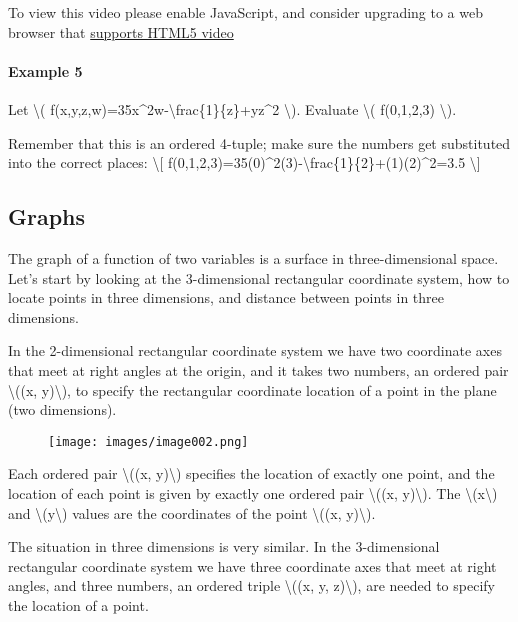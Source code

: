 To view this video please enable JavaScript, and consider upgrading to a
web browser that \href{http://videojs.com/html5-video-support/}{supports
HTML5 video}

\hypertarget{example-5}{%
\paragraph{Example 5}\label{example-5}}

Let \textbackslash{}(
f(x,y,z,w)=35x\^{}2w-\textbackslash{}frac\{1\}\{z\}+yz\^{}2
\textbackslash{}). Evaluate \textbackslash{}( f(0,1,2,3)
\textbackslash{}).

Remember that this is an ordered 4-tuple; make sure the numbers get
substituted into the correct places: \textbackslash{}{[}
f(0,1,2,3)=35(0)\^{}2(3)-\textbackslash{}frac\{1\}\{2\}+(1)(2)\^{}2=3.5
\textbackslash{}{]}

\hypertarget{graphs}{%
\subsection{Graphs}\label{graphs}}

The graph of a function of two variables is a surface in
three-dimensional space. Let's start by looking at the 3-dimensional
rectangular coordinate system, how to locate points in three dimensions,
and distance between points in three dimensions.

In the 2-dimensional rectangular coordinate system we have two
coordinate axes that meet at right angles at the origin, and it takes
two numbers, an ordered pair \textbackslash{}((x, y)\textbackslash{}),
to specify the rectangular coordinate location of a point in the plane
(two dimensions).

\begin{figure}
\centering
\texttt{[image: images/image002.png]}
\caption{}
\end{figure}

Each ordered pair \textbackslash{}((x, y)\textbackslash{}) specifies the
location of exactly one point, and the location of each point is given
by exactly one ordered pair \textbackslash{}((x, y)\textbackslash{}).
The \textbackslash{}(x\textbackslash{}) and
\textbackslash{}(y\textbackslash{}) values are the coordinates of the
point \textbackslash{}((x, y)\textbackslash{}).

The situation in three dimensions is very similar. In the 3-dimensional
rectangular coordinate system we have three coordinate axes that meet at
right angles, and three numbers, an ordered triple \textbackslash{}((x,
y, z)\textbackslash{}), are needed to specify the location of a point.

